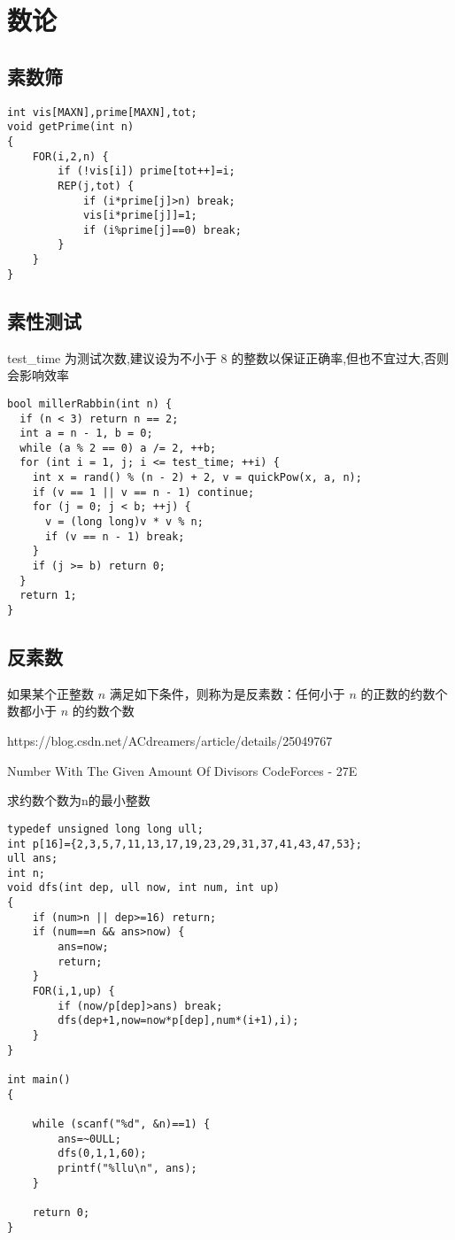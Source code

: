\section{数论}

\subsection{素数筛}

\begin{lstlisting}
int vis[MAXN],prime[MAXN],tot;
void getPrime(int n)
{
    FOR(i,2,n) {
        if (!vis[i]) prime[tot++]=i;
        REP(j,tot) {
            if (i*prime[j]>n) break;
            vis[i*prime[j]]=1;
            if (i%prime[j]==0) break;
        }
    }
}
\end{lstlisting}

\subsection{素性测试}

test\_time 为测试次数,建议设为不小于 8 的整数以保证正确率,但也不宜过大,否则会影响效率

\begin{lstlisting}
bool millerRabbin(int n) {
  if (n < 3) return n == 2;
  int a = n - 1, b = 0;
  while (a % 2 == 0) a /= 2, ++b;
  for (int i = 1, j; i <= test_time; ++i) {
    int x = rand() % (n - 2) + 2, v = quickPow(x, a, n);
    if (v == 1 || v == n - 1) continue;
    for (j = 0; j < b; ++j) {
      v = (long long)v * v % n;
      if (v == n - 1) break;
    }
    if (j >= b) return 0;
  }
  return 1;
}
\end{lstlisting}

\subsection{反素数}

如果某个正整数 $n$ 满足如下条件，则称为是反素数：任何小于 $n$ 的正数的约数个数都小于 $n$ 的约数个数

https://blog.csdn.net/ACdreamers/article/details/25049767

Number With The Given Amount Of Divisors CodeForces - 27E

求约数个数为n的最小整数

\begin{lstlisting}
typedef unsigned long long ull;
int p[16]={2,3,5,7,11,13,17,19,23,29,31,37,41,43,47,53};
ull ans;
int n;
void dfs(int dep, ull now, int num, int up)
{
    if (num>n || dep>=16) return;
    if (num==n && ans>now) {
        ans=now;
        return;
    }
    FOR(i,1,up) {
        if (now/p[dep]>ans) break;
        dfs(dep+1,now=now*p[dep],num*(i+1),i);
    }
}

int main()
{

    while (scanf("%d", &n)==1) {
        ans=~0ULL;
        dfs(0,1,1,60);
        printf("%llu\n", ans);
    }

    return 0;
}
\end{lstlisting}

